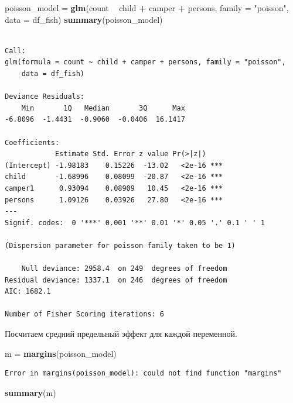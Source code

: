 \documentclass[]{book}
\newenvironment{Shaded}{\begin{snugshade}}{\end{snugshade}}
\newcommand{\DataTypeTok}[1]{\textcolor[rgb]{0.13,0.29,0.53}{#1}}
\newcommand{\KeywordTok}[1]{\textcolor[rgb]{0.13,0.29,0.53}{\textbf{#1}}}
\newcommand{\NormalTok}[1]{#1}
\newcommand{\OperatorTok}[1]{\textcolor[rgb]{0.81,0.36,0.00}{\textbf{#1}}}
\newcommand{\StringTok}[1]{\textcolor[rgb]{0.31,0.60,0.02}{#1}}
\begin{document}
\begin{Shaded}
\begin{Highlighting}[]
\NormalTok{poisson_model =}\StringTok{ }\KeywordTok{glm}\NormalTok{(count }\OperatorTok{~}\StringTok{ }\NormalTok{child }\OperatorTok{+}\StringTok{ }\NormalTok{camper }\OperatorTok{+}\StringTok{  }\NormalTok{persons, }\DataTypeTok{family =} \StringTok{"poisson"}\NormalTok{, }\DataTypeTok{data =}\NormalTok{ df_fish)}
\KeywordTok{summary}\NormalTok{(poisson_model)}
\end{Highlighting}
\end{Shaded}

\begin{verbatim}

Call:
glm(formula = count ~ child + camper + persons, family = "poisson", 
    data = df_fish)

Deviance Residuals: 
    Min       1Q   Median       3Q      Max  
-6.8096  -1.4431  -0.9060  -0.0406  16.1417  

Coefficients:
            Estimate Std. Error z value Pr(>|z|)    
(Intercept) -1.98183    0.15226  -13.02   <2e-16 ***
child       -1.68996    0.08099  -20.87   <2e-16 ***
camper1      0.93094    0.08909   10.45   <2e-16 ***
persons      1.09126    0.03926   27.80   <2e-16 ***
---
Signif. codes:  0 '***' 0.001 '**' 0.01 '*' 0.05 '.' 0.1 ' ' 1

(Dispersion parameter for poisson family taken to be 1)

    Null deviance: 2958.4  on 249  degrees of freedom
Residual deviance: 1337.1  on 246  degrees of freedom
AIC: 1682.1

Number of Fisher Scoring iterations: 6
\end{verbatim}

Посчитаем средний предельный эффект для каждой переменной.

\begin{Shaded}
\begin{Highlighting}[]
\NormalTok{m =}\StringTok{ }\KeywordTok{margins}\NormalTok{(poisson_model)}
\end{Highlighting}
\end{Shaded}

\begin{verbatim}
Error in margins(poisson_model): could not find function "margins"
\end{verbatim}

\begin{Shaded}
\begin{Highlighting}[]
\KeywordTok{summary}\NormalTok{(m)}
\end{Highlighting}
\end{Shaded}
\end{document}
